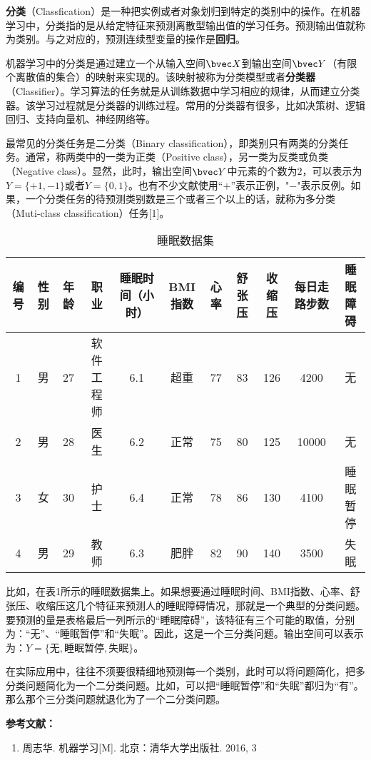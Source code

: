 

\textbf{分类}（Classfication）是一种把实例或者对象划归到特定的类别中的操作。在机器学习中，分类指的是从给定特征来预测离散型输出值的学习任务。预测输出值就称为类别。与之对应的，预测连续型变量的操作是\textbf{回归}。

机器学习中的分类是通过建立一个从输入空间$\bvec X$到输出空间$\bvec Y$（有限个离散值的集合）的映射来实现的。该映射被称为分类模型或者\textbf{分类器}（Classifier）。学习算法的任务就是从训练数据中学习相应的规律，从而建立分类器。该学习过程就是分类器的训练过程。常用的分类器有很多，比如决策树、逻辑回归、支持向量机、神经网络等。

最常见的分类任务是二分类（Binary classification），即类别只有两类的分类任务。通常，称两类中的一类为正类（Positive class），另一类为反类或负类（Negative class）。显然，此时，输出空间$\bvec Y$中元素的个数为$2$，可以表示为$Y=\{+1, -1\}$或者$Y=\{0, 1\}$。也有不少文献使用“$+$”表示正例，"$-$"表示反例。如果，一个分类任务的待预测类别数是三个或者三个以上的话，就称为多分类（Muti-class classification）任务[1]。

\begin{table}[ht]
\centering
\caption{睡眠数据集}\label{tab_Class1}
\begin{tabular}{|c|c|c|c|c|c|c|c|c|c|c|}
\hline
编号 & 性别 & 年龄 & 职业 & 睡眠时间（小时） & BMI指数 & 心率 & 舒张压 & 收缩压 & 每日走路步数 & 睡眠障碍 \\\hline
1 & 男 & 27 & 软件工程师 & 6.1 & 超重 & 77 & 83 & 126 & 4200 & 无 \\
\hline
2 & 男 & 28 & 医生 & 6.2 & 正常 & 75 & 80 & 125 & 10000 & 无 \\
\hline
3 & 女 & 30 & 护士 & 6.4 & 正常 & 78 & 86 & 130 & 4100 & 睡眠暂停 \\
\hline
4 & 男 & 29 & 教师 & 6.3 & 肥胖 & 82 & 90 & 140 & 3500 & 失眠 \\
\hline
\end{tabular}
\end{table}

比如，在表1所示的睡眠数据集上。如果想要通过睡眠时间、BMI指数、心率、舒张压、收缩压这几个特征来预测人的睡眠障碍情况，那就是一个典型的分类问题。要预测的量是表格最后一列所示的“睡眠障碍”，该特征有三个可能的取值，分别为：“无”、“睡眠暂停”和“失眠”。因此，这是一个三分类问题。输出空间可以表示为：$Y=\{\text{无}, \text{睡眠暂停}, \text{失眠}\}$。

在实际应用中，往往不须要很精细地预测每一个类别，此时可以将问题简化，把多分类问题简化为一个二分类问题。比如，可以把“睡眠暂停”和“失眠”都归为“有”。那么那个三分类问题就退化为了一个二分类问题。



\textbf{参考文献：}
\begin{enumerate}
\item 周志华. 机器学习[M]. 北京：清华大学出版社. 2016, 3
\end{enumerate}